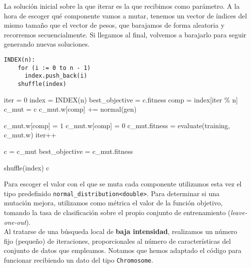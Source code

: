 \documentclass[12pt]{article}
\begin{document}
La solución inicial sobre la que iterar es la que recibimos como parámetro. A la hora de escoger qué componente vamos a mutar, tenemos un vector de índices del mismo tamaño que el vector de pesos, que barajamos de forma aleatoria y recorremos secuencialmente. Si llegamos al final, volvemos a barajarlo para seguir generando nuevas soluciones.

\begin{verbatim}
INDEX(n):
    for (i := 0 to n - 1)
      index.push_back(i)
    shuffle(index)
\end{verbatim}

\begin{algorithm}[h!]
\begin{algorithmic}

    \State iter = 0
    \State index = INDEX(n) 
    \State best\_objective = c.fitness
        \State comp = index[iter $\%$ n]
        \State c\_mut = c
        \State c\_mut.w[comp] += normal(gen)
        
         \State c\_mut.w[comp] = $1$
         \State c\_mut.w[comp] = $0$
        \EndIf
        \State c\_mut.fitness = evaluate(training, c\_mut.w)
        \State iter++

          \State c = c\_mut
          \State best\_objective = c\_mut.fitness
        \EndIf

          \State shuffle(index)
        \EndIf
     \EndWhile
\State \Return c
\EndFunction

\end{algorithmic}
\end{algorithm}

Para escoger el valor con el que se muta cada componente utilizamos esta vez el tipo predefinido \verb|normal_distribution<double>|. Para determinar si una mutación mejora, utilizamos como métrica el valor de la función objetivo, tomando la tasa de clasificación sobre el propio conjunto de entrenamiento (\textit{leave-one-out}).\\

Al tratarse de una búsqueda local de \textbf{baja intensidad}, realizamos un número fijo (pequeño) de iteraciones, proporcionales al número de características del conjunto de datos que empleamos. Notamos que hemos adaptado el código para funcionar recibiendo un dato del tipo \verb|Chromosome|.
\end{document}
